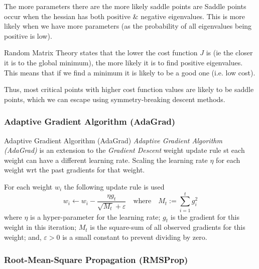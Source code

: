 \documentclass[11pt,a4paper]{article}
\begin{document}
  \begin{remark}{The more parameters there are the more likely saddle points are}
    Saddle points occur when the hessian has both positive \& negative eigenvalues. This is more likely when we have more parameters (as the probability of all eigenvalues being positive is low).
    \par Random Matrix Theory states that the lower the cost function $J$ is (ie the closer it is to the global minimum), the more likely it is to find positive eigenvalues. This means that if we find a minimum it is likely to be a good one (i.e. low cost).
    \par Thus, most critical points with higher cost function values are likely to be saddle points, which we can escape using symmetry-breaking descent methods.
  \end{remark}

\subsubsection{Adaptive Gradient Algorithm (AdaGrad)} \label{sec_AdaGrad}

  \begin{definition}{Adaptive Gradient Algorithm (AdaGrad)}
    \textit{Adaptive Gradient Algorithm (AdaGrad)} is an extension to the \textit{Gradient Descent} weight update rule st each weight can have a different learning rate. Scaling the learning rate $\eta$ for each weight wrt the past gradients for that weight.
    \par For each weight $w_i$ the following update rule is used
    \[
      w_i\leftarrow w_i-\frac{\eta g_t}{\sqrt{M_t}+\varepsilon}\quad\text{where}\quad M_t:=\sum_{i=1}^t g_i^2
    \]
    where $\eta$ is a hyper-parameter for the learning rate; $g_t$ is the gradient for this weight in this iteration; $M_t$ is the square-sum of all observed gradients for this weight; and, $\varepsilon>0$ is a small constant to prevent dividing by zero.
  \end{definition}

\subsubsection{Root-Mean-Square Propagation (RMSProp)} \label{sec_RMSProp}
\end{document}
